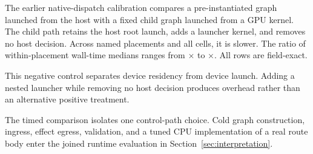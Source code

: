 The earlier native-dispatch calibration compares a pre-instantiated graph
launched from the host with a fixed child graph launched from a GPU kernel. The
child path retains the host root launch, adds a launcher kernel, and removes no
host decision. Across \NativePlacements{} named placements and all \NativeCells{}
cells, it is slower. The ratio of within-placement wall-time medians ranges
from \NativeRatioMin$\times$ to \NativeRatioMax$\times$. All \NativeRows{} rows
are field-exact.

This negative control separates device residency from device launch. Adding a
nested launcher while removing no host decision produces overhead rather than
an alternative positive treatment.

The timed comparison isolates one control-path choice. Cold graph construction,
ingress, effect egress, validation, and a tuned CPU implementation of a real
route body enter the joined runtime evaluation in
Section~\ref{sec:interpretation}.

\FloatBarrier
